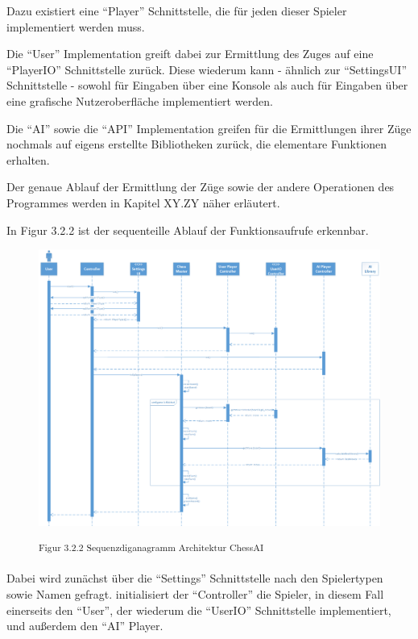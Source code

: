 Dazu existiert eine ``Player'' Schnittstelle, die für jeden dieser Spieler implementiert werden muss.

Die ``User'' Implementation greift dabei zur Ermittlung des Zuges auf eine ``PlayerIO'' Schnittstelle zurück. Diese wiederum kann - ähnlich zur ``SettingsUI'' Schnittstelle - sowohl für Eingaben über eine Konsole als auch für Eingaben über eine grafische Nutzeroberfläche implementiert werden.

Die ``AI'' sowie die ``API'' Implementation greifen für die Ermittlungen ihrer Züge nochmals auf eigens erstellte Bibliotheken zurück, die elementare Funktionen erhalten.

Der genaue Ablauf der Ermittlung der Züge sowie der andere Operationen des Programmes werden in Kapitel XY.ZY näher erläutert.

In Figur 3.2.2 ist der sequenteille Ablauf der Funktionsaufrufe erkennbar.

\begin{figure}[h]
\centering
\includegraphics[width=\textwidth]{images/architecture_sequence_diagram.png}

\textsuperscript{Figur 3.2.2 Sequenzdiganagramm Architektur ChessAI}
\end{figure}

Dabei wird zunächst über die ``Settings'' Schnittstelle nach den Spielertypen sowie Namen gefragt. initialisiert der ``Controller'' die Spieler, in diesem Fall einerseits den ``User'', der wiederum die ``UserIO'' Schnittstelle implementiert, und außerdem den ``AI'' Player. 


